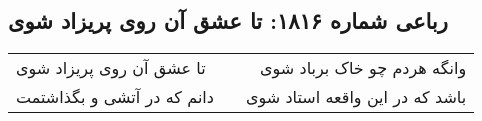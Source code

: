 \begin{center}
\section*{رباعی شماره ۱۸۱۶: تا عشق آن روی پریزاد شوی}
\label{sec:1816}
\begin{longtable}{l p{0.5cm} r}
تا عشق آن روی پریزاد شوی
&&
وانگه هردم چو خاک برباد شوی
\\
دانم که در آتشی و بگذاشتمت
&&
باشد که در این واقعه استاد شوی
\\
\end{longtable}
\end{center}
